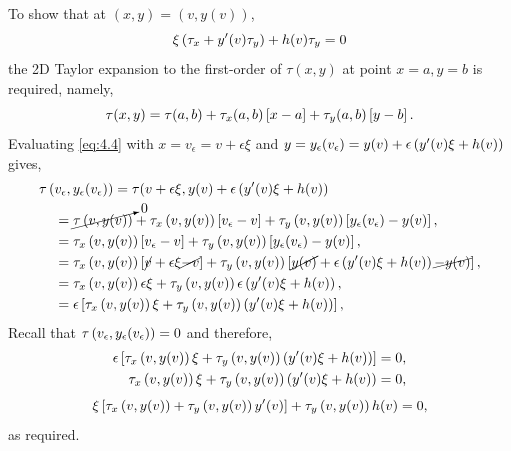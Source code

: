 To show that at $(x,y) = (v,y(v))$,
\[\xi\left(\tau_x+y^\prime(v)\tau_y\right)+h(v)\tau_y=0\]
the 2D Taylor expansion to the first-order of $\tau(x,y)$ at point $x=a, y=b$ is required, namely,
\begin{equation}
\label{eq:4.4}
\tau(x,y) = \tau(a,b) + \tau_x(a,b)\left[x-a\right] + \tau_y(a,b)\left[y-b\right].
\end{equation}
Evaluating \eqref{eq:4.4} with $x=v_\epsilon = v + \epsilon\xi$ and $y=y_\epsilon(v_\epsilon)=y(v) + \epsilon\left(y^\prime(v)\xi+h(v)\right)$ gives,
\begin{equation*}
\begin{split}
\tau&\left(v_\epsilon,y_\epsilon(v_\epsilon)\right) = \tau(v+\epsilon\xi,y(v)+\epsilon\left(y^\prime(v)\xi+h(v)\right)\\
&\;\;= \cancelto{0}{\tau\left(v,y(v)\right)} + \tau_x\left(v,y(v)\right)\left[v_\epsilon-v\right]+\tau_y\left(v,y(v)\right)\left[y_\epsilon(v_\epsilon)-y(v)\right],\\
&\;\;= \tau_x\left(v,y(v)\right)\left[v_\epsilon-v\right]+\tau_y\left(v,y(v)\right)\left[y_\epsilon(v_\epsilon)-y(v)\right],\\
&\;\;= \tau_x\left(v,y(v)\right)\left[\cancel{v}+\epsilon\xi\cancel{-v}\right]+\tau_y\left(v,y(v)\right)\left[\cancel{y(v)} + \epsilon\left(y^\prime(v)\xi+h(v)\right)\cancel{-y(v)}\right],\\
&\;\;= \tau_x\left(v,y(v)\right)\epsilon\xi+\tau_y\left(v,y(v)\right)\epsilon\left(y^\prime(v)\xi+h(v)\right),\\
&\;\;= \epsilon\left[\tau_x\left(v,y(v)\right)\xi+\tau_y\left(v,y(v)\right)\left(y^\prime(v)\xi+h(v)\right)\right],\\
\end{split}
\end{equation*}
Recall that $\tau\left(v_\epsilon,y_\epsilon(v_\epsilon)\right) = 0$ and therefore,
\begin{equation*}
\begin{split}
	\epsilon\left[\tau_x\left(v,y(v)\right)\xi+\tau_y\left(v,y(v)\right)\left(y^\prime(v)\xi+h(v)\right)\right] &= 0,\\
	\tau_x\left(v,y(v)\right)\xi+\tau_y\left(v,y(v)\right)\left(y^\prime(v)\xi+h(v)\right) &= 0,\\
\end{split}
\end{equation*}
\begin{equation}
	\label{eq:4.5}
	\xi\left[\tau_x\left(v,y(v)\right) + \tau_y\left(v,y(v)\right) y^\prime(v)\right] + \tau_y\left(v,y(v)\right) h(v) = 0,
\end{equation}
as required.


